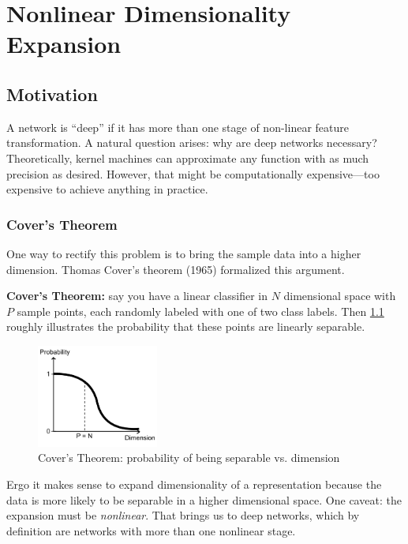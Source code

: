 \chapter{Nonlinear Dimensionality Expansion}

\section{Motivation}

A network is ``deep'' if it has more than one stage of non-linear feature transformation. A natural question arises: why are deep networks necessary?
Theoretically, kernel machines can approximate any function with as much precision as desired.
However, that might be computationally expensive---too expensive to achieve anything in practice.

\subsection{Cover's Theorem}

One way to rectify this problem is to bring the sample data into a higher dimension.
Thomas Cover's theorem (1965) formalized this argument.

\textbf{Cover's Theorem:} say you have a linear classifier in $N$ dimensional space with $P$ sample points, each randomly labeled with one of two class labels.
Then \cref{fig:covers_theorem} roughly illustrates the probability that these points are linearly separable.

\begin{figure}[ht]
\centering
\includegraphics[width=40mm]{figs/covers_theorem.png}
\caption{Cover's Theorem: probability of being separable vs. dimension}
\label{fig:covers_theorem}
\end{figure}

Ergo it makes sense to expand dimensionality of a representation because the data is more likely to be separable in a higher dimensional space.
One caveat: the expansion must be \emph{nonlinear}.
That brings us to deep networks, which by definition are networks with more than one nonlinear stage.

